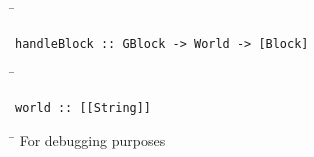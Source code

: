 \begin{tabbing}
\hspace*{1cm}\= \kill
\> 
\end{tabbing}
\begin{verbatim}
handleBlock :: GBlock -> World -> [Block]
\end{verbatim}
\begin{tabbing}
\hspace*{1cm}\= \kill
\> 
\end{tabbing}
\begin{verbatim}
world :: [[String]]
\end{verbatim}
\begin{tabbing}
\hspace*{1cm}\= \kill
\> For debugging purposes
\end{tabbing}
